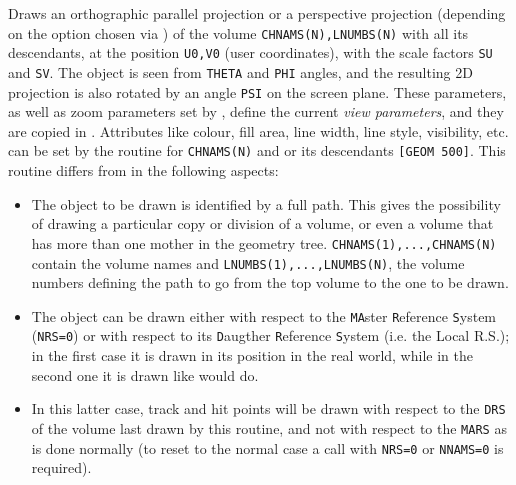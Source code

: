   
Draws an orthographic parallel projection or a perspective projection 
(depending on the option chosen via ) of the volume 
{\tt CHNAMS(N),LNUMBS(N)} with all its descendants, at the position 
{\tt U0,V0} (user coordinates), with the scale factors {\tt SU} and 
{\tt SV}. 
The object is seen from {\tt THETA} and {\tt PHI} angles, 
and the resulting 2D projection is also rotated by an angle {\tt PSI} 
on the screen plane. These parameters, as well as zoom parameters set 
by , define the current {\it view parameters}, and they are 
copied in .  Attributes like colour, fill area, line 
width, line style, visibility, etc. can be set by the  
routine for {\tt CHNAMS(N)} and or its descendants {\tt [GEOM 500]}.
This routine differs from  in the following aspects:
\begin{itemize}
\item  The object to be drawn is identified by a full path. This gives 
the possibility of drawing a particular copy or division of a volume, or 
even a volume that has more than one mother in the geometry tree.
{\tt CHNAMS(1),...,CHNAMS(N)} contain the volume names and
{\tt LNUMBS(1),...,LNUMBS(N)}, the volume numbers defining the path 
to go from the top volume to the one to be drawn.
\item  The object can be drawn either with respect to the
{\tt MA}ster {\tt R}eference {\tt S}ystem ({\tt NRS=0}) or with respect 
to its {\tt D}augther {\tt R}eference {\tt S}ystem (i.e. the Local R.S.); 
in the first case it is drawn in its position in the real world, while 
in the second one it is drawn like  would do.
\item  In this latter case, track and hit points will be
drawn with respect to the {\tt DRS} of the volume last
drawn by this routine, and not with respect to the
{\tt MARS} as is done normally (to reset to the normal
case a call with {\tt NRS=0} or {\tt NNAMS=0} is required).
\end{itemize}
